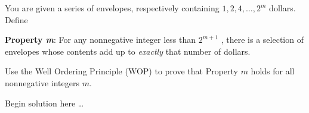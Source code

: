 \begin{pr}
    You are given a series of envelopes, respectively containing $1,2,4,\ldots,2^{m}$ dollars.\\
    Define
    \begin{propertym}
        \textbf{Property \textsl{m}}: For any nonnegative integer less than $2^{m+1}$
        , there is a selection of envelopes whose contents add up to \textsl{exactly}
        that number of dollars.
    \end{propertym}
    Use the Well Ordering Principle (WOP) to prove
    that Property $m$ holds for all nonnegative integers $m$.
\end{pr}

\begin{solution}
    Begin solution here \ldots
\end{solution}
